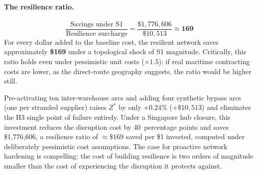 \paragraph{The resilience ratio.}
\[
  \frac{\text{Savings under S1}}{\text{Resilience surcharge}}
  = \frac{\$1{,}776{,}606}{\$10{,}513}
  \approx \mathbf{169}
\]
For every dollar added to the baseline cost, the resilient
network saves approximately \textbf{\$169} under a topological
shock of S1 magnitude. Critically, this ratio holds even under
pessimistic unit costs ($\times 1.5$): if real maritime
contracting costs are lower, as the direct-route geography
suggests, the ratio would be higher still.
 
\begin{tcolorbox}[notebox, title={Resilience key finding}]
\small
Pre-activating ten inter-warehouse arcs and adding four synthetic
bypass arcs (one per stranded supplier) raises $Z^*$ by only
$+0.24\%$ ($+\$10{,}513$) and eliminates the H3 single point
of failure entirely. Under a Singapore hub closure, this
investment reduces the disruption cost by 40~percentage points
and saves \$1{,}776{,}606, a resilience ratio of $\approx\$169$
saved per \$1 invested, computed under deliberately pessimistic
cost assumptions. The case for proactive network hardening is
compelling: the cost of building resilience is two orders of
magnitude smaller than the cost of experiencing the disruption
it protects against.
\end{tcolorbox}